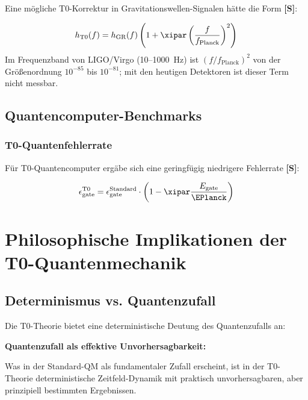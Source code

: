	Eine mögliche T0-Korrektur in Gravitationswellen-Signalen hätte die Form \textbf{[S]}:
	
	\begin{equation}
		h_{\text{T0}}(f) = h_{\text{GR}}(f) \left(1 + \xipar \left(\frac{f}{f_{\text{Planck}}}\right)^2\right)
	\end{equation}
	Im Frequenzband von LIGO/Virgo (10--1000~Hz) ist $(f/f_{\text{Planck}})^2$ von der Größenordnung $10^{-85}$ bis $10^{-81}$; mit den heutigen Detektoren ist dieser Term nicht messbar.
	
	\subsection{Quantencomputer-Benchmarks}
	
	\subsubsection{T0-Quantenfehlerrate}
	
	Für T0-Quantencomputer ergäbe sich eine geringfügig niedrigere Fehlerrate \textbf{[S]}:
	
	\begin{equation}
		\epsilon_{\text{gate}}^{\text{T0}} = \epsilon_{\text{gate}}^{\text{Standard}} \cdot \left(1 - \xipar \frac{E_{\text{gate}}}{\EPlanck}\right)
	\end{equation}
	
	\section{Philosophische Implikationen der T0-Quantenmechanik}
	
	\subsection{Determinismus vs. Quantenzufall}
	
	Die T0-Theorie bietet eine deterministische Deutung des Quantenzufalls an:
	
	\begin{tcolorbox}[colback=purple!5!white,colframe=purple!75!black,title=T0-Determinismus]
		\textbf{Quantenzufall als effektive Unvorhersagbarkeit:}
		
		Was in der Standard-QM als fundamentaler Zufall erscheint, ist in der T0-Theorie deterministische Zeitfeld-Dynamik mit praktisch unvorhersagbaren, aber prinzipiell bestimmten Ergebnissen.
		

	\end{tcolorbox}
	
